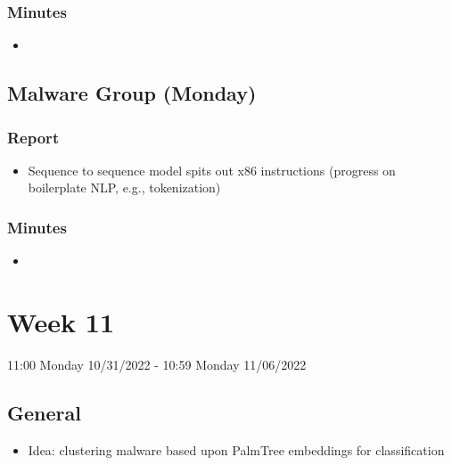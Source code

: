 \documentclass{article}
\begin{document}
\subsubsection*{Minutes}
\begin{itemize}
	\item 
\end{itemize}

\subsection*{Malware Group (Monday)}
\subsubsection*{Report}
\begin{itemize}
	\item Sequence to sequence model spits out x86 instructions (progress on boilerplate NLP, e.g., tokenization)
\end{itemize}
\subsubsection*{Minutes}
\begin{itemize}
	\item 
\end{itemize}

\pagebreak


\section*{Week 11}
11:00 Monday 10/31/2022 - 10:59 Monday 11/06/2022

\subsection*{General}
\begin{itemize}
	\item Idea: clustering malware based upon PalmTree embeddings for classification
\end{itemize}
\end{document}
